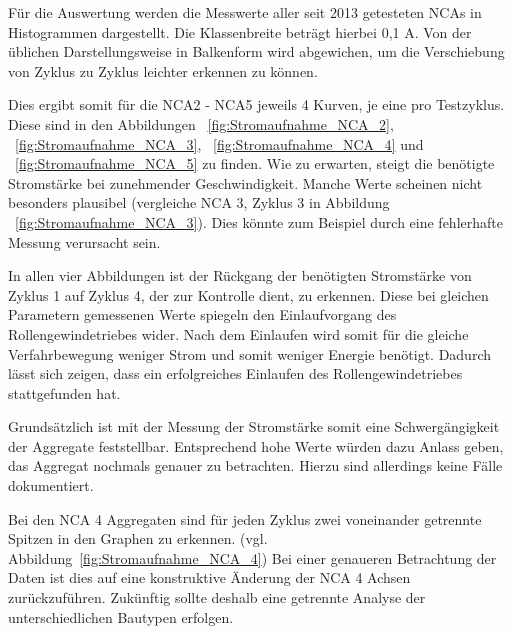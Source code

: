Für die Auswertung werden die Messwerte aller seit 2013 getesteten NCAs in Histogrammen dargestellt. Die Klassenbreite beträgt hierbei 0,1 A. Von der üblichen Darstellungsweise in Balkenform wird abgewichen, um die Verschiebung von Zyklus zu Zyklus leichter erkennen zu können.



Dies ergibt somit für die NCA2 - NCA5 jeweils 4 Kurven, je eine pro Testzyklus. Diese sind in den Abbildungen ~\ref{fig:Stromaufnahme_NCA_2}, ~\ref{fig:Stromaufnahme_NCA_3}, ~\ref{fig:Stromaufnahme_NCA_4} und ~\ref{fig:Stromaufnahme_NCA_5} zu finden. Wie zu erwarten, steigt die benötigte Stromstärke bei zunehmender Geschwindigkeit. Manche Werte scheinen nicht besonders plausibel (vergleiche NCA 3, Zyklus 3 in Abbildung ~\ref{fig:Stromaufnahme_NCA_3}). Dies könnte zum Beispiel durch eine fehlerhafte Messung verursacht sein.

In allen vier Abbildungen ist der Rückgang der benötigten Stromstärke von Zyklus 1 auf Zyklus 4, der zur Kontrolle dient, zu erkennen. Diese bei gleichen Parametern gemessenen Werte spiegeln den Einlaufvorgang des Rollengewindetriebes wider. Nach dem Einlaufen wird somit für die gleiche Verfahrbewegung weniger Strom und somit weniger Energie benötigt. Dadurch lässt sich zeigen, dass ein erfolgreiches Einlaufen des Rollengewindetriebes stattgefunden hat.

Grundsätzlich ist mit der Messung der Stromstärke somit eine Schwergängigkeit der Aggregate feststellbar. Entsprechend hohe Werte würden dazu Anlass geben, das Aggregat nochmals genauer zu betrachten. Hierzu sind allerdings keine Fälle dokumentiert.

Bei den NCA 4 Aggregaten sind für jeden Zyklus zwei voneinander getrennte Spitzen in den Graphen zu erkennen. (vgl. Abbildung~\ref{fig:Stromaufnahme_NCA_4}) Bei einer genaueren Betrachtung der Daten ist dies auf eine konstruktive Änderung der NCA 4 Achsen zurückzuführen. Zukünftig sollte deshalb eine getrennte Analyse der unterschiedlichen Bautypen erfolgen.


